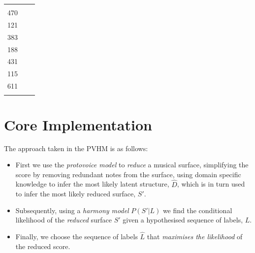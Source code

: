 \documentclass[12pt,a4paper,twoside,openright]{report}
\theoremstyle{definition}
\begin{document}
{\begin{table}[!t]
\begin{tabularx}{\textwidth}{l X c}
\begin{minipage}[t]{8cm}
  \end{minipage} & 
  \begin{minipage}[t]{0.5cm}
    2272
    \vspace{0.1\DTbaselineskip}\\
    470\\
    \vspace{\DTbaselineskip}
    121\\
    \vspace{\DTbaselineskip}
    383\\
    \vspace{1.8\DTbaselineskip}
    188\\
    \vspace{3.7\DTbaselineskip}
    431\\
    \vspace{3\DTbaselineskip}
    115\\
    \vspace{2.5\DTbaselineskip}
    611\\
  \end{minipage}
\end{tabularx}
\end{table}
}


\section{Core Implementation}

The approach taken in the PVHM is as follows:

\begin{itemize}
  \item First we use the \textit{protovoice model} to \textit{reduce} a musical surface, simplifying the score by removing redundant notes from the surface, using domain specific knowledge to infer the most likely latent structure, $\hat{D}$, which is in turn used to infer the most likely reduced surface, $S'$.
  \item Subsequently, using a \textit{harmony model} $P(S'|L)$ we find the conditional likelihood of the \textit{reduced} surface $S'$ given a hypothesised sequence of labels, $L$.
  \item Finally, we choose the sequence of labels $\hat{L}$ that \textit{maximises the likelihood} of the reduced score.
\end{itemize}
\end{document}
